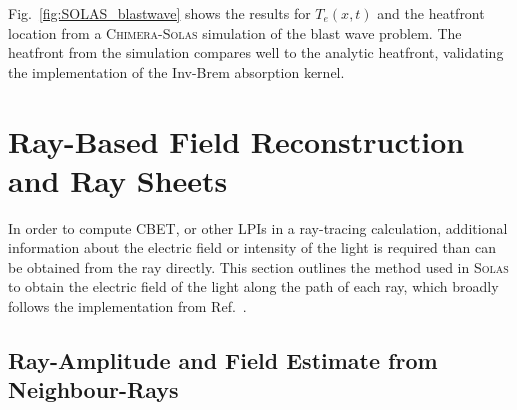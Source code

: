 Fig.~\ref{fig:SOLAS_blastwave} shows the results for $T_e(x,t)$ and the heatfront location from a \textsc{Chimera}-\textsc{Solas} simulation of the blast wave problem.
The heatfront from the simulation compares well to the analytic heatfront, validating the implementation of the \ac{Inv-Brem} absorption kernel.


\section{Ray-Based Field Reconstruction and Ray Sheets}%
\label{sec:SOLAS_field_reconstruc}

In order to compute \ac{CBET}, or other \ac{LPIs} in a ray-tracing calculation, additional information about the electric field or intensity of the light is required than can be obtained from the ray directly.
This section outlines the method used in \textsc{Solas} to obtain the electric field of the light along the path of each ray, which broadly follows the implementation from Ref.~\cite{follett_validation_2022}.

\subsection{Ray-Amplitude and Field Estimate from Neighbour-Rays}%
\label{sec:SOLAS_ray_amplitude}

